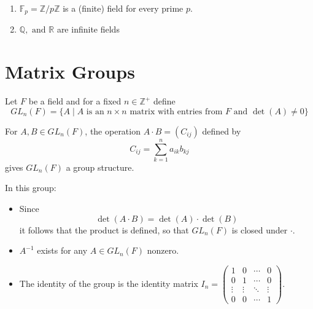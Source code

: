 \documentclass[11pt,a4paper]{article}
\begin{document}
\begin{exa}
    \begin{enumerate}[label=(\roman*)]
        \item \(\mathbb{F}_p = \mathbb{Z} / p \mathbb{Z}\) is a (finite) field for every prime \(p\).
        \item \( \mathbb{Q},\text{ and } \mathbb{R} \) are infinite fields
    \end{enumerate}
    
\end{exa}
  
\section*{Matrix Groups}

Let \( F \) be a   field and for a fixed \( n \in \mathbb{Z}^+ \) define 
\[
GL_n(F) = \{ A \mid A \text{ is an } n \times n \text{ matrix with entries from } F \text{ and } \det(A) \neq 0 \}
\]

For \( A, B \in GL_n(F) \), the operation \( A \cdot B = (C_{ij}) \) defined by 
\[
C_{ij} = \sum_{k=1}^{n} a_{ik}b_{kj}
\]
gives  \( GL_n(F) \) a group structure. 

\begin{rem}
    In this group:
\begin{itemize}
    \item Since
\[
\det(A \cdot B) = \det(A) \cdot \det(B)
\]
it follows that the product is defined, so that \(GL_n(F)\) is closed under \(\cdot\).    
    \item \( A^{-1} \) exists for any \(A\in GL_n(F)\) nonzero.
    \item The identity of the group is the identity matrix \(  I_n = \begin{pmatrix} 1 & 0 & \cdots & 0 \\ 0 & 1 & \cdots & 0 \\ \vdots & \vdots & \ddots & \vdots \\ 0 & 0 & \cdots & 1 \end{pmatrix}  \).
\end{itemize}

\end{rem}
\end{document}
